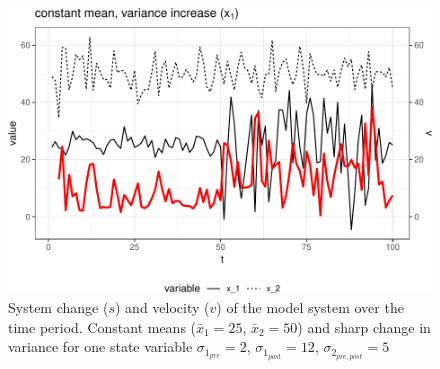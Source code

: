 \documentclass[12pt,twoside,openany]{reedthesis}
\begin{document}
\begin{figure}
\centering
\includegraphics{_myDissertation_files/figure-latex/velocSysEx3-1.pdf}
\caption{\label{fig:velocSysEx3}System change (\(s\)) and velocity (\(v\)) of the model system over the time period. Constant means (\(\bar{x}_1=25\), \(\bar{x}_2=50\)) and sharp change in variance for one state variable \(\sigma_{1_{pre}} = 2\), \(\sigma_{1_{post}} = 12\), \(\sigma_{2_{pre,post}} = 5\)}
\end{figure}
\end{document}
